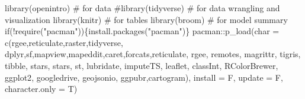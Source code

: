 \documentclass[
  letterpaper,
  DIV=11,
  numbers=noendperiod]{scrartcl}
\newenvironment{Shaded}{\begin{snugshade}}{\end{snugshade}}
\newcommand{\AttributeTok}[1]{\textcolor[rgb]{0.40,0.45,0.13}{#1}}
\newcommand{\CommentTok}[1]{\textcolor[rgb]{0.37,0.37,0.37}{#1}}
\newcommand{\ControlFlowTok}[1]{\textcolor[rgb]{0.00,0.23,0.31}{#1}}
\newcommand{\FunctionTok}[1]{\textcolor[rgb]{0.28,0.35,0.67}{#1}}
\newcommand{\NormalTok}[1]{\textcolor[rgb]{0.00,0.23,0.31}{#1}}
\newcommand{\SpecialCharTok}[1]{\textcolor[rgb]{0.37,0.37,0.37}{#1}}
\newcommand{\StringTok}[1]{\textcolor[rgb]{0.13,0.47,0.30}{#1}}
\begin{document}
\begin{Shaded}
\begin{Highlighting}[]
\FunctionTok{library}\NormalTok{(openintro)  }\CommentTok{\# for data}
\CommentTok{\#library(tidyverse)  \# for data wrangling and visualization}
\FunctionTok{library}\NormalTok{(knitr)      }\CommentTok{\# for tables}
\FunctionTok{library}\NormalTok{(broom)      }\CommentTok{\# for model summary}
\ControlFlowTok{if}\NormalTok{(}\SpecialCharTok{!}\FunctionTok{require}\NormalTok{(}\StringTok{"pacman"}\NormalTok{))\{}\FunctionTok{install.packages}\NormalTok{(}\StringTok{"pacman"}\NormalTok{)\}}
\NormalTok{pacman}\SpecialCharTok{::}\FunctionTok{p\_load}\NormalTok{(}\AttributeTok{char =} \FunctionTok{c}\NormalTok{(}\StringTok{\textquotesingle{}rgee\textquotesingle{}}\NormalTok{,}\StringTok{\textquotesingle{}reticulate\textquotesingle{}}\NormalTok{,}\StringTok{\textquotesingle{}raster\textquotesingle{}}\NormalTok{,}\StringTok{\textquotesingle{}tidyverse\textquotesingle{}}\NormalTok{,}
                \StringTok{\textquotesingle{}dplyr\textquotesingle{}}\NormalTok{,}\StringTok{\textquotesingle{}sf\textquotesingle{}}\NormalTok{,}\StringTok{\textquotesingle{}mapview\textquotesingle{}}\NormalTok{,}\StringTok{\textquotesingle{}mapeddit\textquotesingle{}}\NormalTok{,}\StringTok{\textquotesingle{}caret\textquotesingle{}}\NormalTok{,}\StringTok{\textquotesingle{}forcats\textquotesingle{}}\NormalTok{,}\StringTok{\textquotesingle{}reticulate\textquotesingle{}}\NormalTok{,}
                \StringTok{\textquotesingle{}rgee\textquotesingle{}}\NormalTok{, }\StringTok{\textquotesingle{}remotes\textquotesingle{}}\NormalTok{, }\StringTok{\textquotesingle{}magrittr\textquotesingle{}}\NormalTok{, }\StringTok{\textquotesingle{}tigris\textquotesingle{}}\NormalTok{, }\StringTok{\textquotesingle{}tibble\textquotesingle{}}\NormalTok{, }\StringTok{\textquotesingle{}stars\textquotesingle{}}\NormalTok{,                       }\StringTok{\textquotesingle{}stars\textquotesingle{}}\NormalTok{,}
                \StringTok{\textquotesingle{}st\textquotesingle{}}\NormalTok{, }\StringTok{\textquotesingle{}lubridate\textquotesingle{}}\NormalTok{, }\StringTok{\textquotesingle{}imputeTS\textquotesingle{}}\NormalTok{, }\StringTok{\textquotesingle{}leaflet\textquotesingle{}}\NormalTok{, }\StringTok{\textquotesingle{}classInt\textquotesingle{}}\NormalTok{,                            }\StringTok{\textquotesingle{}RColorBrewer\textquotesingle{}}\NormalTok{,}
                \StringTok{\textquotesingle{}ggplot2\textquotesingle{}}\NormalTok{, }\StringTok{\textquotesingle{}googledrive\textquotesingle{}}\NormalTok{, }\StringTok{\textquotesingle{}geojsonio\textquotesingle{}}\NormalTok{, }\StringTok{\textquotesingle{}ggpubr\textquotesingle{}}\NormalTok{,}\StringTok{\textquotesingle{}cartogram\textquotesingle{}}\NormalTok{), }
               \AttributeTok{install =}\NormalTok{ F, }\AttributeTok{update =}\NormalTok{ F, }\AttributeTok{character.only =}\NormalTok{ T)}
\end{Highlighting}
\end{Shaded}
\end{document}
